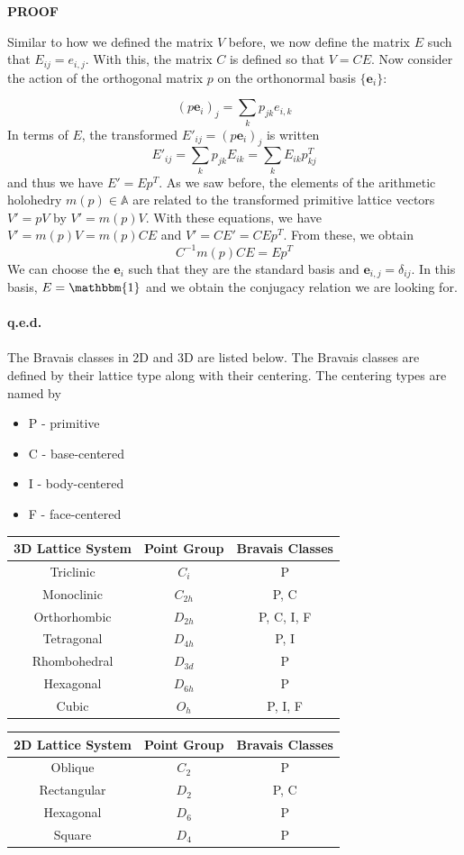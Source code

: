 \documentclass[9 pt]{report}
\def\*#1{\boldsymbol{#1}}
\begin{document}
\begin{center}
	\textbf{PROOF}
\end{center}
Similar to how we defined the matrix $V$ before, we now define the matrix $E$ such that $E_{ij} = e_{i,j}$. With this, the matrix $C$ is defined so that $V = CE $. Now consider the action of the orthogonal matrix $p$ on the orthonormal basis $\{\*e_i\}$:

$$ (p\*e_i)_j = \sum_{k}p_{j k}e_{i,k} $$ 
In terms of $E$, the transformed $E'_{ij} = (p\*e_i)_j$ is written
$$ E'_{ij} = \sum_k p_{jk}E_{ik} = \sum_k E_{ik}p^T_{kj} $$
and thus we have $E' = Ep^T$. As we saw before, the elements of the arithmetic holohedry $m(p) \in \mathbb{A}$ are related to the transformed primitive lattice vectors $V'=pV$ by $V' = m(p)V $. With these equations, we have $ V' = m(p)V = m(p)CE $ and $V' =CE' = CEp^T$. From these, we obtain
$$ C^{-1}m(p)CE = Ep^T $$
We can choose the $\*e_i$ such that they are the standard basis and $\*e_{i,j}=\delta_{ij}$. In this basis, $E=\mathbbm{1}$ and we obtain the conjugacy relation we are looking for.
\\
\\
\textbf{q.e.d.}
\\
\\
The Bravais classes in 2D and 3D are listed below. The Bravais classes are defined by their lattice type along with their centering. The centering types are named by
\\
\begin{itemize}
	\item P - primitive
	\item C - base-centered
	\item I - body-centered
	\item F - face-centered
\end{itemize}

\begin{center}
	\begin{tabular}{|c|c|c|}
		\hline
		3D Lattice System & Point Group & Bravais Classes \\
		\hline\hline
		Triclinic & $C_i$ & P \\
		\hline 
		Monoclinic & $C_{2h}$ & P, C\\
		\hline 
		Orthorhombic & $D_{2h}$ & P, C, I, F\\
		\hline
		Tetragonal & $D_{4h}$ & P, I\\
		\hline
		Rhombohedral & $D_{3d}$ & P\\
		\hline
		Hexagonal &  $D_{6h}$ & P\\
		\hline
		Cubic & $O_h$ & P, I, F\\
		\hline
	\end{tabular}
	\quad
	\begin{tabular}{|c|c|c|}
		\hline
		2D Lattice System & Point Group & Bravais Classes\\
		\hline\hline
		Oblique & $C_2$ & P\\
		\hline
		Rectangular & $D_2$ & P, C\\
		\hline
		Hexagonal & $D_6$ & P\\
		\hline
		Square & $D_4$ & P\\
		\hline
	\end{tabular}
\end{center}
\end{document}

